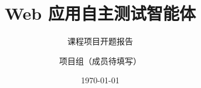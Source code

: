 \documentclass[aspectratio=169,fontset=fandol]{ctexbeamer}
\title[Web 应用自主测试]{Web 应用自主测试智能体}
\subtitle{课程项目开题报告}
\author{项目组（成员待填写）}
\institute{WebAppAutoTestAgent}
\date{\today}
\begin{document}
\begin{frame}\titlepage\end{frame}









\end{document}
